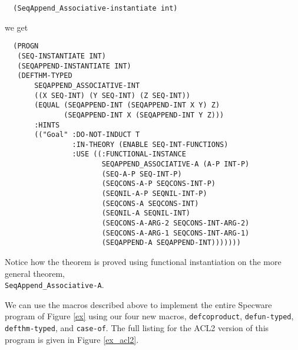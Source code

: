 \documentclass[]{eptcs}
\begin{document}
\begin{verbatim}
  (SeqAppend_Associative-instantiate int)
\end{verbatim}
we get
\begin{verbatim}
  (PROGN
   (SEQ-INSTANTIATE INT)
   (SEQAPPEND-INSTANTIATE INT)
   (DEFTHM-TYPED
       SEQAPPEND_ASSOCIATIVE-INT
       ((X SEQ-INT) (Y SEQ-INT) (Z SEQ-INT))
       (EQUAL (SEQAPPEND-INT (SEQAPPEND-INT X Y) Z)
              (SEQAPPEND-INT X (SEQAPPEND-INT Y Z)))
       :HINTS
       (("Goal" :DO-NOT-INDUCT T
                :IN-THEORY (ENABLE SEQ-INT-FUNCTIONS)
                :USE ((:FUNCTIONAL-INSTANCE 
                       SEQAPPEND_ASSOCIATIVE-A (A-P INT-P)
                       (SEQ-A-P SEQ-INT-P)
                       (SEQCONS-A-P SEQCONS-INT-P)
                       (SEQNIL-A-P SEQNIL-INT-P)
                       (SEQCONS-A SEQCONS-INT)
                       (SEQNIL-A SEQNIL-INT)
                       (SEQCONS-A-ARG-2 SEQCONS-INT-ARG-2)
                       (SEQCONS-A-ARG-1 SEQCONS-INT-ARG-1)
                       (SEQAPPEND-A SEQAPPEND-INT)))))))
\end{verbatim}
Notice how the theorem is proved using functional instantiation on the more general theorem, \\\verb|SeqAppend_Associative-A|.

We can use the macros described above to implement the entire Specware program of Figure \ref{ex} using our four new macros, \verb|defcoproduct|, \verb|defun-typed|, \verb|defthm-typed|, and \verb|case-of|. The full listing for the ACL2 version of this program is given in Figure \ref{ex_acl2}.
\end{document}
